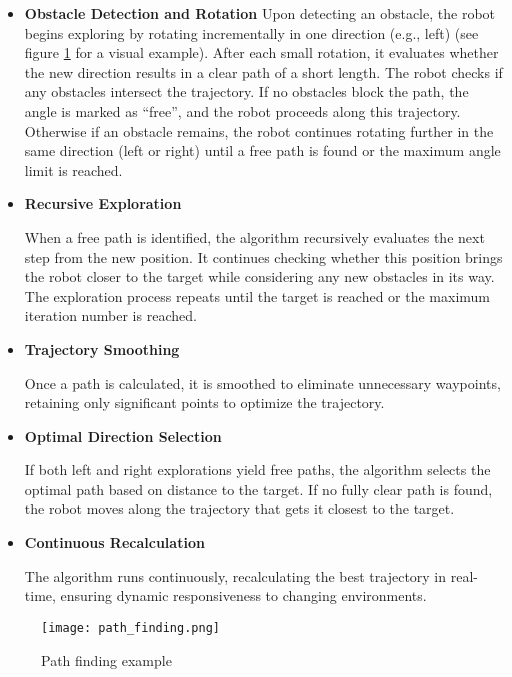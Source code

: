 \begin{itemize}
    \item \textbf{Obstacle Detection and Rotation}
    Upon detecting an obstacle, the robot begins exploring by rotating incrementally in one direction (e.g., left) (see figure \ref{fig:path_finding} for a visual example). After each small rotation, it evaluates whether the new direction results in a clear path of a short length. The robot checks if any obstacles intersect the trajectory.
    If no obstacles block the path, the angle is marked as “free”, and the robot proceeds along this trajectory.
    Otherwise if an obstacle remains, the robot continues rotating further in the same direction (left or right) until a free path is found or the maximum angle limit is reached.

    \item \textbf{Recursive Exploration}

    When a free path is identified, the algorithm recursively evaluates the next step from the new position. It continues checking whether this position brings the robot closer to the target while considering any new obstacles in its way. The exploration process repeats until the target is reached or the maximum iteration number is reached.

    \item \textbf{Trajectory Smoothing}

    Once a path is calculated, it is smoothed to eliminate unnecessary waypoints, retaining only significant points to optimize the trajectory.

    \item \textbf{Optimal Direction Selection}

    If both left and right explorations yield free paths, the algorithm selects the optimal path based on distance to the target. If no fully clear path is found, the robot moves along the trajectory that gets it closest to the target.

    \item \textbf{Continuous Recalculation}

    The algorithm runs continuously, recalculating the best trajectory in real-time, ensuring dynamic responsiveness to changing environments.
\end{itemize}

\begin{figure}
    \centering
    \texttt{[image: path\_finding.png]}
    \caption{Path finding example}
    \label{fig:path_finding}
\end{figure}

